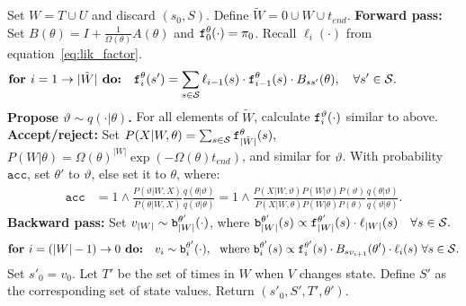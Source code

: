 \begin{algorithm}[H]
\begin{algorithmic}[1]
      \State 
      Set $W = T \cup U$ and discard $(s_0,S)$. Define $\tilde{W} = 0 \cup W \cup t_{end}$.
    \State 
    \textbf{Forward pass:}
    Set $B(\theta) = I + \frac{1}{\Omega(\theta)}A(\theta)$ and
    $\mathtt{f}^\theta_0(\cdot) = \pi_0$. Recall $\ell_i(\cdot)$ from equation~\eqref{eq:lik_factor}.
\vspace{-.25in}
    $$\textbf{for } i=1\rightarrow |\tilde{W}|\textbf{ do:} \quad \mathtt{f}^{\theta}_i(s') = \sum_{s \in {\mathcal S}} \ell_{i-1}(s) \cdot \mathtt{f}^\theta_{i-1}(s)\cdot B_{ss'}(\theta), \quad \forall s' \in {\mathcal S}.\qquad\qquad\quad $$
    \State \textbf{Propose $\vartheta \sim q(\cdot| \theta)$.}
    For all elements of $\tilde{W}$, calculate $\mathtt{f}^\vartheta_i(\cdot)$ similar to above.
      \State \textbf{Accept/reject:} 
      Set $P(X|W,\theta) = \sum_{s \in {\mathcal S}} \mathtt{f}_{|\tilde{W}|}^\theta(s),$ $P(W|\theta) = \Omega(\theta)^{|W|}\exp(-\Omega(\theta)t_{end})$, and similar for $\vartheta$. 
      With probability $\texttt{acc}$, set $\theta'$ to $\vartheta$, else set it to $\theta$, where: %
          \begin{align}
            \label{eq:ncp_acc}
            \texttt{acc} &=  1 \wedge \frac{P(\vartheta|W, X)}{P(\theta|W, X)} \frac{q(\theta|\vartheta)}{q(\vartheta|\theta)}
          =  1 \wedge \frac{P(X| W,\vartheta) P(W | \vartheta)P(\vartheta)}
            {P(X|W, \theta)P(W | \theta)P(\theta)} \frac{q(\theta|\vartheta)}{q(\vartheta|\theta)}.
          \end{align}
    \State %
    \textbf{Backward pass:}
    Set $v_{|W|} \sim \mathtt{b}^{\theta'}_{|W|}(\cdot)$, where $\mathtt{b}^{\theta'}_{|W|}(s) \propto \mathtt{f}^{\theta'}_{|W|}(s)\cdot\ell_{|W|}(s) \quad \forall s \in {\mathcal S}.$ 
\vspace{-.1in}
    $$ \textbf{for } i=(|W|-1)\rightarrow 0\textbf{ do:} \quad v_i \sim \mathtt{b}^{\theta'}_i(\cdot),\ \ \text{where } 
    \mathtt{b}^{\theta'}_i(s) \propto \mathtt{f}^{\theta'}_i(s)\cdot B_{sv_{i+1}}(\theta') \cdot \ell_i(s)  \ \forall s \in {\mathcal S}.$$
    \State Set $s'_0=v_0$. Let $T'$ be the set of times in $W$ when $V$ changes state. Define $S'$ as the corresponding set of state values. Return $(s'_0, S', T', \theta')$.
\end{algorithmic}
\end{algorithm}
